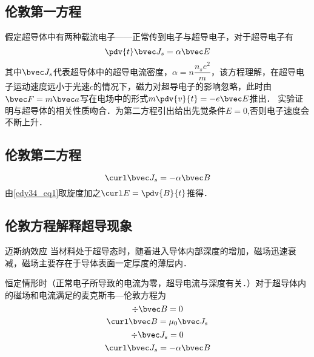 \subsection{伦敦第一方程}
假定超导体中有两种载流电子——正常传到电子与超导电子，对于超导电子有
\begin{equation}
\pdv{t}\bvec J_s=\alpha\bvec E \label{edy34_eq1}
\end{equation}
其中$\bvec J_s$代表超导体中的超导电流密度，$\alpha=n\dfrac {n_se^2}m$，该方程理解，在超导电子运动速度远小于光速$c$的情况下，磁力对超导电子的影响忽略，此时由$\bvec F=m \bvec a$写在电场中的形式$m\pdv{v}{t}=-e\bvec E$推出．
实验证明与超导体的相关性质吻合．为第二方程引出给出先觉条件$E=0$,否则电子速度会不断上升．
\subsection{伦敦第二方程}
\begin{equation}
\curl\bvec J_s=-\alpha\bvec B \label{edy34_eq2}
\end{equation}
由\autoref{edy34_eq1}取旋度加之$\curl E=\pdv{B}{t}$推得．
\subsection{伦敦方程解释超导现象}
\begin{theorem}{迈斯纳效应}
当材料处于超导态时，随着进入导体内部深度的增加，磁场迅速衰减，磁场主要存在于导体表面一定厚度的薄层内．
\end{theorem}
恒定情形时（正常电子所导致的电流为零，超导电流与深度有关．）对于超导体内的磁场和电流满足的麦克斯韦—伦敦方程为
\begin{equation}
\div \bvec B=0\label{edy34_eq3}
\end{equation}
\begin{equation}
\curl \bvec B=\mu_0 \bvec J_s\label{edy34_eq4}
\end{equation}
\begin{equation}
\div \bvec J_s=0
\end{equation}
\begin{equation}
\curl \bvec J_s=-\alpha\bvec B
\end{equation}

